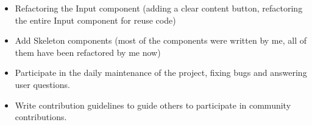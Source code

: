 \documentclass{resume}
\newcommand{\en}[1]{#1}
\newcommand{\zh}[1]{}
\begin{document}
\en{}
\zh{\role{维护者}{\href{https://github.com/ant-design/ant-design/commits?author=hi-rustin}{24+ 个提交}}}
\begin{itemize}
      \item \en{Refactoring the Input component (adding a clear content button, refactoring the entire Input component for reuse code)}
            \zh{重构 Input 组件（添加一个清除内容按钮，为了复用代码重构整个 Input 组件）}
      \item \en{Add Skeleton components (most of the components were written by me, all of them have been refactored by me now)}
            \zh{添加 Skeleton 组件（大部分组件由我编写，目前所有组件已被我重构）}
      \item \en{Participate in the daily maintenance of the project, fixing bugs and answering user questions.}
            \zh{参与项目日常维护，修复 bug 和回答用户问题。}
      \item \en{Write contribution guidelines to guide others to participate in community contributions.}
            \zh{编写贡献指南，引导其他人参与社区贡献。}
\end{itemize}
\end{document}
